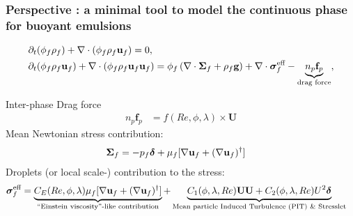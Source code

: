 \documentclass{sintefbeamer}
\begin{document}
\begin{frame}
  \frametitle{Perspective : a minimal tool to model the continuous phase for buoyant emulsions}


  \begin{align*}
    &\partial_t (\phi_f \rho_f)  
    + \mathbf{\nabla}\cdot (
        \phi_f \rho_f\textbf{u}_f
    )
    = 
    0,\\
    &\partial_t (\phi_f\rho_f \textbf{u}_f)
    + \mathbf{\nabla}\cdot (\phi_f\rho_f \textbf{u}_f\textbf{u}_f)
    = \phi_f 
    \left(\mathbf{\nabla}\cdot \bm{\Sigma}_f
    + \rho_f \textbf{g}\right)
    + \mathbf{\nabla}\cdot  \bm{\sigma}_f^{\text{eff}}
    - \underbrace{n_p \textbf{f}_p}_\text{drag force},
  \end{align*}
  \pause
  
Inter-phase Drag force 
  \begin{align*}
    n_p \textbf{f}_p  
    &= 
    f(Re,\phi, \lambda) \times \textbf{U}
  \end{align*}
Mean Newtonian stress contribution: 
\begin{align*}
  \bm\Sigma_f &= - p_f \bm\delta + \mu_f [\mathbf{\nabla} \textbf{u}_f +  (\mathbf{\nabla} \textbf{u}_f)^\dagger ] 
\end{align*}
Droplets  (or local scale-)  contribution to the stress:
\begin{align*}
    \bm{\sigma}^{\text{eff}}_f 
    &= \underbrace{C_E(Re,\phi,\lambda) \mu_f [\mathbf{\nabla} \textbf{u}_f +  (\mathbf{\nabla} \textbf{u}_f)^\dagger ] }_\text{``Einstein viscosity''-like contribution}
    + 
    \underbrace{
      C_1(\phi,\lambda,Re)\textbf{UU}
    + C_2(\phi,\lambda,Re)U^2 \bm\delta}_\text{Mean particle Induced Turbulence (PIT) \& Stresslet}
\end{align*}

\end{frame}
\backmatter
\end{document}
